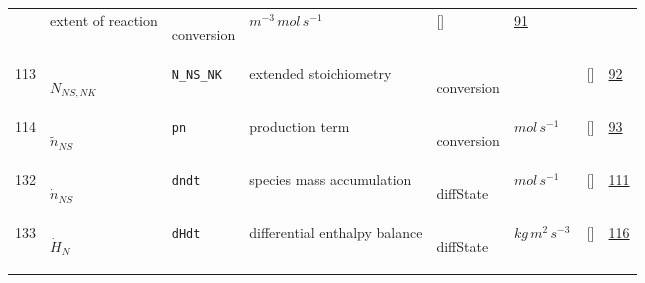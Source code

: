 \begin{longtable}{|p{1cm}|p{3cm}|p{3cm}|p{7cm}|p{3.0cm}|p{3cm}|p{2cm}|p{1cm}|}
             & extent of reaction
             & \begin{lay}conversion \end{lay}
             & $ m^{-3} \,mol \,s^{-1} \, $
             & []
             & \hyperlink{"e:91"}{ 91 }
                 \\
    113
             & \hypertarget{"v:113"}{ $ {N}_{{N S}, {N K}} $}
             & \verb|N_NS_NK|
             & extended stoichiometry
             & \begin{lay}conversion \end{lay}
             & $  $
             & []
             & \hyperlink{"e:92"}{ 92 }
                 \\
    114
             & \hypertarget{"v:114"}{ $ {\tilde{n}}_{{N S}} $}
             & \verb|pn|
             & production term
             & \begin{lay}conversion \end{lay}
             & $ mol \,s^{-1} \, $
             & []
             & \hyperlink{"e:93"}{ 93 }
                 \\
    132
             & \hypertarget{"v:132"}{ $ {\dot{n}}_{{N S}} $}
             & \verb|dndt|
             & species mass accumulation
             & \begin{lay}diffState \end{lay}
             & $ mol \,s^{-1} \, $
             & []
             & \hyperlink{"e:111"}{ 111 }
                 \\
    133
             & \hypertarget{"v:133"}{ $ {\dot{H}}_{N} $}
             & \verb|dHdt|
             & differential enthalpy balance
             & \begin{lay}diffState \end{lay}
             & $ kg \,m^{2} \,s^{-3} \, $
             & []
             & \hyperlink{"e:116"}{ 116 }
                 \\
    \end{longtable}
